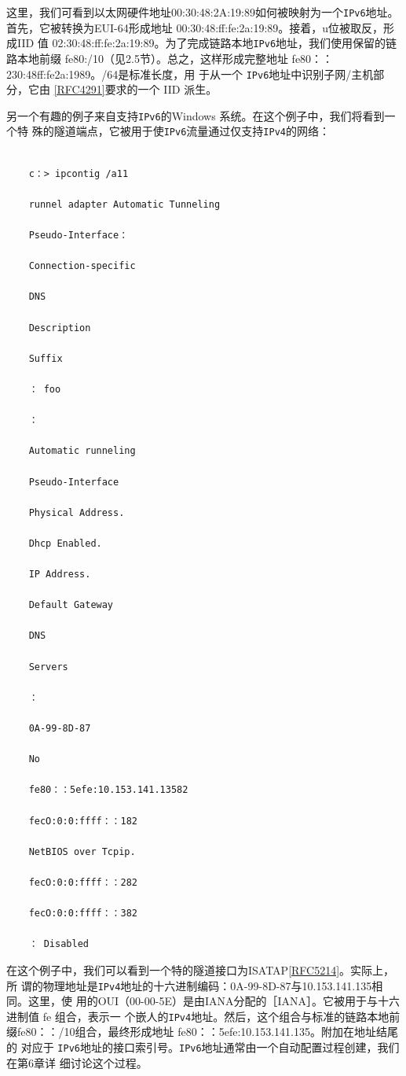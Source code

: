 这里，我们可看到以太网硬件地址00:30:48:2A:19:89如何被映射为一个\verb|IPv6|地址。
首先，它被转换为EUI-64形成地址 00:30:48:ff:fe:2a:19:89。接着，u位被取反，形成IID
值 02:30:48:ff:fe:2a:19:89。为了完成链路本地\verb|IPv6|地址，我们使用保留的链路本地前缀
fe80:/10（见2.5节）。总之，这样形成完整地址 fe80：：230:48ff:fe2a:1989。/64是标准长度，用
于从一个 \verb|IPv6|地址中识别子网/主机部分，它由 \href{https://www.rfc-editor.org/rfc/rfc4291}{[RFC4291]}要求的一个 IID 派生。

另一个有趣的例子来自支持\verb|IPv6|的Windows 系统。在这个例子中，我们将看到一个特
殊的隧道端点，它被用于使\verb|IPv6|流量通过仅支持\verb|IPv4|的网络：
\begin{verbatim}
    
    c：> ipcontig /a11
    
    runnel adapter Automatic Tunneling
    
    Pseudo-Interface：
    
    Connection-specific
    
    DNS
    
    Description
    
    Suffix
    
    ： foo
    
    ：
    
    Automatic runneling
    
    Pseudo-Interface
    
    Physical Address.
    
    Dhcp Enabled.
    
    IP Address.
    
    Default Gateway
    
    DNS
    
    Servers
    
    ：
    
    0A-99-8D-87
    
    No
    
    fe80：：5efe:10.153.141.13582
    
    fecO:0:0:ffff：：182
    
    NetBIOS over Tcpip. 
    
    fecO:0:0:ffff：：282
    
    fecO:0:0:ffff：：382
    
    ： Disabled
\end{verbatim}

在这个例子中，我们可以看到一个特的隧道接口为ISATAP\href{https://www.rfc-editor.org/rfc/rfc5214}{[RFC5214]}。实际上，所
谓的物理地址是\verb|IPv4|地址的十六进制编码：0A-99-8D-87与10.153.141.135相同。这里，使
用的OUI（00-00-5E）是由IANA分配的［IANA］。它被用于与十六进制值 fe 组合，表示一
个嵌人的\verb|IPv4|地址。然后，这个组合与标准的链路本地前缀fe80：：/10组合，最终形成地址
fe80：：5efe:10.153.141.135。附加在地址结尾的%
对应于 \verb|IPv6|地址的接口索引号。\verb|IPv6|地址通常由一个自动配置过程创建，我们在第6章详
细讨论这个过程。


